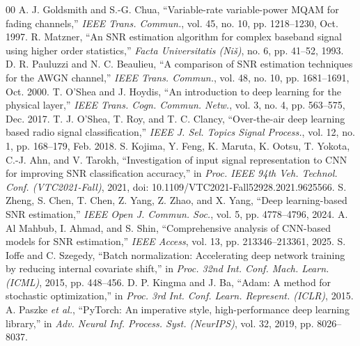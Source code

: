 \documentclass[conference]{IEEEtran}
\begin{document}
\begin{thebibliography}{00}
 A. J. Goldsmith and S.-G. Chua, ``Variable-rate variable-power MQAM for fading channels,'' \textit{IEEE Trans. Commun.}, vol. 45, no. 10, pp. 1218--1230, Oct. 1997.
 R. Matzner, ``An SNR estimation algorithm for complex baseband signal using higher order statistics,'' \textit{Facta Universitatis (Niš)}, no. 6, pp. 41--52, 1993.
 D. R. Pauluzzi and N. C. Beaulieu, ``A comparison of SNR estimation techniques for the AWGN channel,'' \textit{IEEE Trans. Commun.}, vol. 48, no. 10, pp. 1681--1691, Oct. 2000.
 T. O'Shea and J. Hoydis, ``An introduction to deep learning for the physical layer,'' \textit{IEEE Trans. Cogn. Commun. Netw.}, vol. 3, no. 4, pp. 563--575, Dec. 2017.
 T. J. O'Shea, T. Roy, and T. C. Clancy, ``Over-the-air deep learning based radio signal classification,'' \textit{IEEE J. Sel. Topics Signal Process.}, vol. 12, no. 1, pp. 168--179, Feb. 2018.
 S. Kojima, Y. Feng, K. Maruta, K. Ootsu, T. Yokota, C.-J. Ahn, and V. Tarokh, ``Investigation of input signal representation to CNN for improving SNR classification accuracy,'' in \textit{Proc. IEEE 94th Veh. Technol. Conf. (VTC2021-Fall)}, 2021, doi: 10.1109/VTC2021-Fall52928.2021.9625566.
 S. Zheng, S. Chen, T. Chen, Z. Yang, Z. Zhao, and X. Yang, ``Deep learning-based SNR estimation,'' \textit{IEEE Open J. Commun. Soc.}, vol. 5, pp. 4778--4796, 2024.
 A. Al Mahbub, I. Ahmad, and S. Shin, ``Comprehensive analysis of CNN-based models for SNR estimation,'' \textit{IEEE Access}, vol. 13, pp. 213346--213361, 2025.
 S. Ioffe and C. Szegedy, ``Batch normalization: Accelerating deep network training by reducing internal covariate shift,'' in \textit{Proc. 32nd Int. Conf. Mach. Learn. (ICML)}, 2015, pp. 448--456.
 D. P. Kingma and J. Ba, ``Adam: A method for stochastic optimization,'' in \textit{Proc. 3rd Int. Conf. Learn. Represent. (ICLR)}, 2015.
 A. Paszke \textit{et al.}, ``PyTorch: An imperative style, high-performance deep learning library,'' in \textit{Adv. Neural Inf. Process. Syst. (NeurIPS)}, vol. 32, 2019, pp. 8026--8037.
\end{thebibliography}
\end{document}
